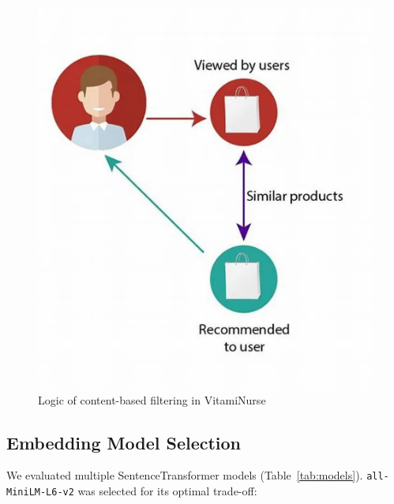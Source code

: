 \begin{figure}[H]
\centering
\includegraphics[scale=0.35]{images/cb_filtering_logic.png}
\caption{Logic of content-based filtering in VitamiNurse}
\label{fig:CB_filtering_logic}
\end{figure}

\subsection{Embedding Model Selection}
We evaluated multiple SentenceTransformer models (Table~\ref{tab:models}). \texttt{all-MiniLM-L6-v2} was selected for its optimal trade-off:

\begin{table}[H]
\centering
\caption{Performance comparison of SentenceTransformer models}
\label{tab:models}
\end{table}

